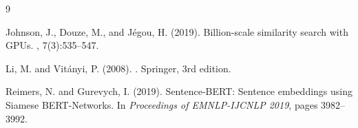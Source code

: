 \documentclass[11pt,a4paper]{article}
\begin{document}

\begin{thebibliography}{9}

Johnson, J., Douze, M., and J{\'e}gou, H. (2019).
\newblock Billion-scale similarity search with GPUs.
, 7(3):535--547.

Li, M. and Vit{\'a}nyi, P. (2008).
.
\newblock Springer, 3rd edition.

Reimers, N. and Gurevych, I. (2019).
\newblock Sentence-BERT: Sentence embeddings using Siamese BERT-Networks.
\newblock In {\em Proceedings of EMNLP-IJCNLP 2019}, pages 3982--3992.

\end{thebibliography}
\end{document}
